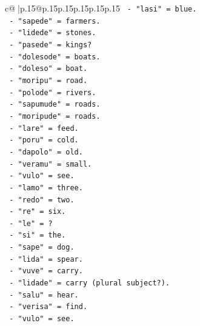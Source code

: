 \documentclass{article}
\begin{document}
{\begin{supertabular}{c@{$\;$}|p{.15\linewidth}@{}p{.15\linewidth}p{.15\linewidth}p{.15\linewidth}p{.15\linewidth}p{.15\linewidth}}
{{{\texttt{                        {-} "lasi" = blue.} \\
\texttt{                        {-} "sapede" = farmers.} \\
\texttt{                        {-} "lidede" = stones.} \\
\texttt{                        {-} "pasede" = kings?} \\
\texttt{                        {-} "dolesode" = boats.} \\
\texttt{                        {-} "doleso" = boat.} \\
\texttt{                        {-} "moripu" = road.} \\
\texttt{                        {-} "polode" = rivers.} \\
\texttt{                        {-} "sapumude" = roads.} \\
\texttt{                        {-} "moripude" = roads.} \\
\texttt{                        {-} "lare" = feed.} \\
\texttt{                        {-} "poru" = cold.} \\
\texttt{                        {-} "dapolo" = old.} \\
\texttt{                        {-} "veramu" = small.} \\
\texttt{                        {-} "vulo" = see.} \\
\texttt{                        {-} "lamo" = three.} \\
\texttt{                        {-} "redo" = two.} \\
\texttt{                        {-} "re" = six.} \\
\texttt{                        {-} "le" = ?} \\
\texttt{                        {-} "si" = the.} \\
\texttt{                        {-} "sape" = dog.} \\
\texttt{                        {-} "lida" = spear.} \\
\texttt{                        {-} "vuve" = carry.} \\
\texttt{                        {-} "lidade" = carry (plural subject?).} \\
\texttt{                        {-} "salu" = hear.} \\
\texttt{                        {-} "verisa" = find.} \\
\texttt{                        {-} "vulo" = see.} \\
}}}
\end{supertabular}}
\end{document}
